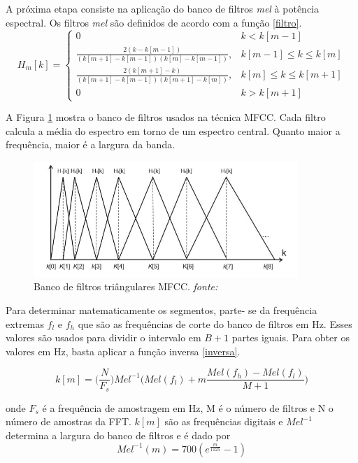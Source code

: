 A próxima etapa consiste na aplicação do banco de filtros \textit{mel} à potência espectral. Os filtros \textit{mel} são definidos de acordo com a função \ref{filtro}.
\begin{equation}
\label{filtro}
H_m[k] = \left\{\begin{array}{ll}
0 & k < k[m-1]\\
\displaystyle \frac{2(k-k[m-1])}{(k[m+1]-k[m-1])(k[m]-k[m-1])}, & k[m-1] \leq k \leq k[m] \\
\displaystyle \frac{2(k[m+1]-k)}{(k[m+1]-k[m-1])(k[m+1]-k[m])}, & k[m] \leq k \leq k[m+1] \\
0 & k > k[m+1]\end{array} \right.
\end{equation}

A Figura \ref{fig:filtro} mostra o banco de filtros usados na técnica MFCC. Cada filtro calcula a média do espectro em torno de um espectro central. Quanto maior a frequência, maior é a largura da banda.

\begin{figure}[H]
\centering %
\includegraphics[width=10cm]{img/filtrotriangular.jpg} %
\caption{Banco de filtros triângulares MFCC. \textit{fonte: \cite{pucpncc}}}
\label{fig:filtro}
\end{figure}

Para determinar matematicamente os segmentos, parte- se da frequência extremas $f_l$ e $f_h$ que são as frequências de corte do banco de filtros em Hz. Esses valores são usados para dividir o intervalo em $B+1$ partes iguais. Para obter os valores em Hz, basta aplicar a função inversa \ref{inversa}.

\begin{equation}
\label{inversa}
k[m] = \big( \frac{N}{F_s}\big) Mel^{-1} \big(Mel(f_l) + m \frac{Mel(f_h)- Mel(f_l)}{M+1}\big)
\end{equation}

onde $F_s$ é a frequência de amostragem em Hz, M é o número de filtros e N o número de amostras da FFT. $k[m]$ são as frequências digitais e $Mel^{-1}$ determina a largura do banco de filtros e é dado por
\begin{equation}
Mel^{-1}(m) = 700(e^{\frac{m}{1125}} - 1)
\end{equation}

